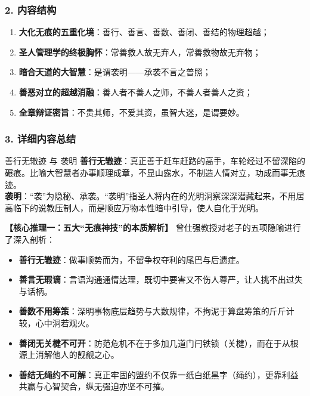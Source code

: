 \subsubsection{2. 内容结构}
\begin{enumerate}
    \item \textbf{大化无痕的五重化境}：善行、善言、善数、善闭、善结的物理超越；
    \item \textbf{圣人管理学的终极胸怀}：常善救人故无弃人，常善救物故无弃物；
    \item \textbf{暗合天道的大智慧}：是谓袭明——承袭不言之普照；
    \item \textbf{善恶对立的超越消融}：善人者不善人之师，不善人者善人之资；
    \item \textbf{全章辩证密旨}：不贵其师，不爱其资，虽智大迷，是谓要妙。
\end{enumerate}

\subsubsection{3. 详细内容总结}

\begin{ConceptBox}{善行无辙迹 与 袭明}
\textbf{善行无辙迹}：真正善于赶车赶路的高手，车轮经过不留深陷的碾痕。比喻大智慧者办事顺理成章，不显山露水，不制造人情对立，功成而事无痕迹。\\
\textbf{袭明}：“袭”为隐秘、承袭。“袭明”指圣人将内在的光明洞察深深潜藏起来，不用居高临下的说教压制人，而是顺应万物本性暗中引导，使人自化于光明。
\end{ConceptBox}

\noindent\textbf{【核心推理一：五大“无痕神技”的本质解析】}
曾仕强教授对老子的五项隐喻进行了深入剖析：
\begin{itemize}
    \item \textbf{善行无辙迹}：做事顺势而为，不留争权夺利的尾巴与后遗症。
    \item \textbf{善言无瑕谪}：言语沟通通情达理，既切中要害又不伤人尊严，让人挑不出过失与话柄。
    \item \textbf{善数不用筹策}：深明事物底层趋势与大数规律，不拘泥于算盘筹策的斤斤计较，心中洞若观火。
    \item \textbf{善闭无关楗不可开}：防范危机不在于多加几道门闩铁锁（关楗），而在于从根源上消解他人的觊觎之心。
    \item \textbf{善结无绳约不可解}：真正牢固的盟约不仅靠一纸白纸黑字（绳约），更靠利益共赢与心智契合，纵无强迫亦坚不可摧。
\end{itemize}

